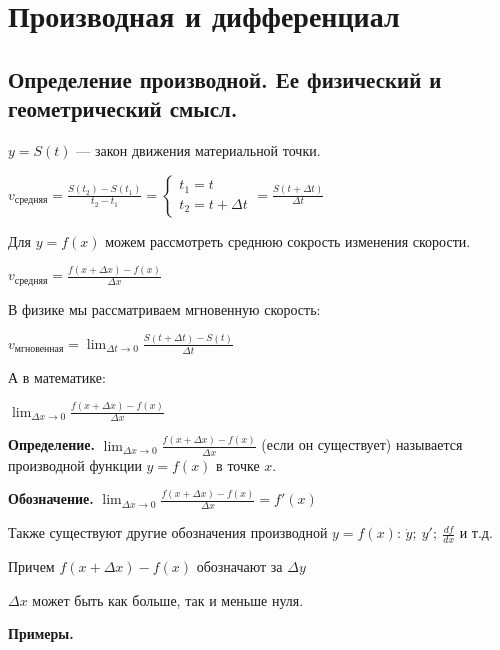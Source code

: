 \documentclass{article}
\begin{document}
    \section{Производная и дифференциал}
    \subsection{Определение производной. Ее физический и геометрический смысл.}

    \( y = S(t) \) --- закон движения материальной точки. 

    \( v_\textrm{средняя} = \frac{S(t_2) - S(t_1)}{t_2 - t_1} = \begin{cases}
        t_1 = t\\
        t_2 = t + \Delta t
    \end{cases} = \frac{S(t + \Delta t)}{\Delta t} \)

    Для \( y = f(x) \) можем рассмотреть среднюю сокрость изменения скорости.

    \( v_\textrm{средняя} = \frac{f(x + \Delta x) - f(x)}{\Delta x} \)

    В физике мы рассматриваем мгновенную скорость:
    
    \( v_\textrm{мгновенная} = \lim_{\Delta t \to 0} \frac{S(t + \Delta t) - S(t)}{\Delta t} \)
    
    А в математике:
    
    \(\lim_{\Delta x \to 0} \frac{f(x+\Delta x)-f(x)}{\Delta x}\)
    
    \textbf{Определение.} \( \lim_{\Delta x \to 0} \frac{f(x + \Delta x) - f(x)}{\Delta x} \) (если он существует) называется производной функции \( y = f(x) \) в точке \(x\).

    \textbf{Обозначение.} \( \lim_{\Delta x \to 0} \frac{f(x + \Delta x) - f(x)}{\Delta x} = f'(x) \)

    Также существуют другие обозначения производной \( y = f(x) \): \( \dot{y};\ y';\ \frac{df}{dx} \) и т.д.

    Причем \( f(x + \Delta x) - f(x) \) обозначают за \(\Delta y\)
    
    \(\Delta x\) может быть как больше, так и меньше нуля.

    \textbf{Примеры.}
\end{document}
